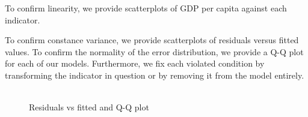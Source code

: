 \documentclass[12pt]{article}
\begin{document}
To confirm linearity, we provide scatterplots of GDP per capita against each indicator.

To confirm constance variance, we provide scatterplots of residuals versus fitted values. To confirm the normality of the error distribution, we provide a Q-Q plot for each of our models. Furthermore, we fix each violated condition by transforming the indicator in question or by removing it from the model entirely.

\begin{figure}[h!]
  \centering
  \includegraphics[width=\textwidth]{images/climate_model_conditions}
  \caption{\label{climate_model_conditions}Residuals vs fitted and Q-Q plot}
\end{figure}
\end{document}
